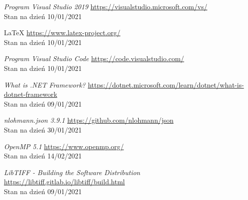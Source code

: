 \documentclass{article}
\begin{document}
\begin{thebibliography}{9}
        \textit{Program Visual Studio 2019}
        \url{https://visualstudio.microsoft.com/vs/}\\
        Stan na dzień 10/01/2021

        \LaTeX \space
        \url{https://www.latex-project.org/}\\
        Stan na dzień 10/01/2021

        \textit{Program Visual Studio Code}
        \url{https://code.visualstudio.com/}\\
        Stan na dzień 10/01/2021

        \textit{What is .NET Framework?}
        \url{https://dotnet.microsoft.com/learn/dotnet/what-is-dotnet-framework}\\
        Stan na dzień 09/01/2021

        \textit{nlohmann.json 3.9.1}
        \url{https://github.com/nlohmann/json}\\
        Stan na dzień 30/01/2021

        \textit{OpenMP 5.1}
        \url{https://www.openmp.org/}\\
        Stan na dzień 14/02/2021

        \textit{LibTIFF - Building the Software Distribution}
        \url{https://libtiff.gitlab.io/libtiff/build.html}\\
        Stan na dzień 09/01/2021

    \end{thebibliography}
    \newpage
    \listoffigures
\end{document}
